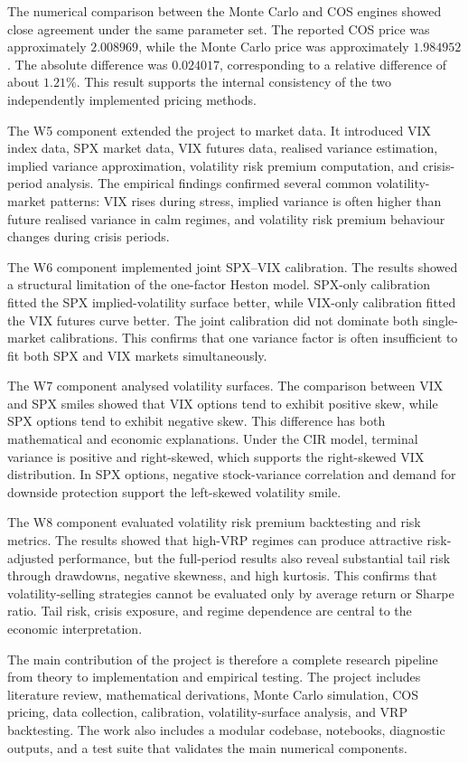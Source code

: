 The numerical comparison between the Monte Carlo and COS engines showed close agreement under the same parameter set. The reported COS price was approximately \(2.008969\), while the Monte Carlo price was approximately \(1.984952\). The absolute difference was \(0.024017\), corresponding to a relative difference of about \(1.21\%\). This result supports the internal consistency of the two independently implemented pricing methods.

The W5 component extended the project to market data. It introduced VIX index data, SPX market data, VIX futures data, realised variance estimation, implied variance approximation, volatility risk premium computation, and crisis-period analysis. The empirical findings confirmed several common volatility-market patterns: VIX rises during stress, implied variance is often higher than future realised variance in calm regimes, and volatility risk premium behaviour changes during crisis periods.

The W6 component implemented joint SPX--VIX calibration. The results showed a structural limitation of the one-factor Heston model. SPX-only calibration fitted the SPX implied-volatility surface better, while VIX-only calibration fitted the VIX futures curve better. The joint calibration did not dominate both single-market calibrations. This confirms that one variance factor is often insufficient to fit both SPX and VIX markets simultaneously.

The W7 component analysed volatility surfaces. The comparison between VIX and SPX smiles showed that VIX options tend to exhibit positive skew, while SPX options tend to exhibit negative skew. This difference has both mathematical and economic explanations. Under the CIR model, terminal variance is positive and right-skewed, which supports the right-skewed VIX distribution. In SPX options, negative stock-variance correlation and demand for downside protection support the left-skewed volatility smile.

The W8 component evaluated volatility risk premium backtesting and risk metrics. The results showed that high-VRP regimes can produce attractive risk-adjusted performance, but the full-period results also reveal substantial tail risk through drawdowns, negative skewness, and high kurtosis. This confirms that volatility-selling strategies cannot be evaluated only by average return or Sharpe ratio. Tail risk, crisis exposure, and regime dependence are central to the economic interpretation.

The main contribution of the project is therefore a complete research pipeline from theory to implementation and empirical testing. The project includes literature review, mathematical derivations, Monte Carlo simulation, COS pricing, data collection, calibration, volatility-surface analysis, and VRP backtesting. The work also includes a modular codebase, notebooks, diagnostic outputs, and a test suite that validates the main numerical components.

